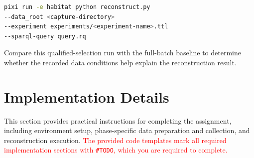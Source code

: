 \documentclass[11pt]{article}
\begin{document}
\begin{lstlisting}[language=bash]
pixi run -e habitat python reconstruct.py 
--data_root <capture-directory> 
--experiment experiments/<experiment-name>.ttl 
--sparql-query query.rq
\end{lstlisting}

Compare this qualified-selection run with the full-batch baseline to determine
whether the recorded data conditions help explain the reconstruction result.

\section{Implementation Details}

This section provides practical instructions for completing the assignment, including environment setup, phase-specific data preparation and collection, and reconstruction execution. \textcolor{red}{The provided code templates mark all required implementation sections with  \texttt{\#TODO}, which you are required to complete.}


\end{document}
